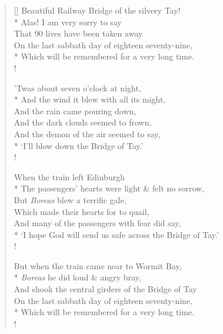 \documentclass[MAIN]{subfiles}
\begin{document}
\begin{verse}[\versewidth]
Beautiful {\sc Railway Bridge} of the silvery {\sc Tay}!\\*
Alas! I am very sorry to say\\
That 90 lives have been taken away\\
On the last sabbath day of eighteen seventy-nine,\\*
Which will be remembered for a very long time.\\!

'Twas about seven o'clock at night,\\*
And the wind it blew with all its might,\\
And the rain came pouring down,\\
And the dark clouds seemed to frown,\\
And the demon of the air seemed to say,\\*
`I'll blow down the {\sc Bridge of Tay}.'\\!

When the train left {\sc Edinburgh}\\*
The passengers' hearts were light \& felt no sorrow,\\
But \emph{Boreas} blew a terrific gale,\\
Which made their hearts for to quail,\\
And many of the passengers with fear did say,\\*
`I hope God will send us safe across the {\sc Bridge of Tay}.'\\!

But when the train came near to {\sc Wormit Bay},\\*
\emph{Boreas} he did loud \& angry bray,\\
And shook the central girders of the {\sc Bridge of Tay}\\
On the last sabbath day of eighteen seventy-nine,\\*
Which will be remembered for a very long time.\\!


\end{verse}
\end{document}
